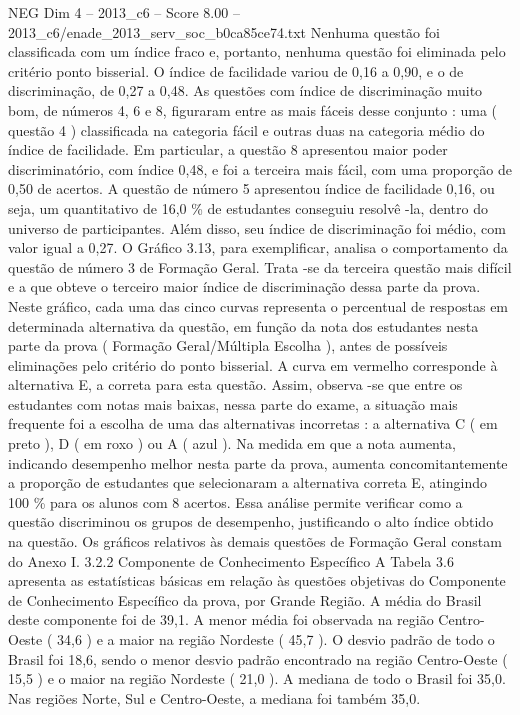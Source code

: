 \begin{textsample}{NEG Dim 4 – 2013\_c6 – Score 8.00 – 2013\_c6/enade\_2013\_serv\_soc\_b0ca85ce74.txt}
Nenhuma questão foi classificada com um índice fraco e, portanto, nenhuma questão foi eliminada pelo critério ponto bisserial.
O índice de facilidade variou de 0,16 a 0,90, e o de discriminação, de 0,27 a 0,48.
As questões com índice de discriminação muito bom, de números 4, 6 e 8, figuraram entre as mais fáceis desse conjunto : uma ( questão 4 ) classificada na categoria fácil e outras duas na categoria médio do índice de facilidade.
Em particular, a questão 8 apresentou maior poder discriminatório, com índice 0,48, e foi a terceira mais fácil, com uma proporção de 0,50 de acertos.
A questão de número 5 apresentou índice de facilidade 0,16, ou seja, um quantitativo de 16,0 \% de estudantes conseguiu resolvê -la, dentro do universo de participantes.
Além disso, seu índice de discriminação foi médio, com valor igual a 0,27.
O Gráfico 3.13, para exemplificar, analisa o comportamento da questão de número 3 de Formação Geral.
Trata -se da terceira questão mais difícil e a que obteve o terceiro maior índice de discriminação dessa parte da prova.
Neste gráfico, cada uma das cinco curvas representa o percentual de respostas em determinada alternativa da questão, em função da nota dos estudantes nesta parte da prova ( Formação Geral/Múltipla Escolha ), antes de possíveis eliminações pelo critério do ponto bisserial.
A curva em vermelho corresponde à alternativa E, a correta para esta questão.
Assim, observa -se que entre os estudantes com notas mais baixas, nessa parte do exame, a situação mais frequente foi a escolha de uma das alternativas incorretas : a alternativa C ( em preto ), D ( em roxo ) ou A ( azul ).
Na medida em que a nota aumenta, indicando desempenho melhor nesta parte da prova, aumenta concomitantemente a proporção de estudantes que selecionaram a alternativa correta E, atingindo 100 \% para os alunos com 8 acertos.
Essa análise permite verificar como a questão discriminou os grupos de desempenho, justificando o alto índice obtido na questão.
Os gráficos relativos às demais questões de Formação Geral constam do Anexo I. 3.2.2 Componente de Conhecimento Específico A Tabela 3.6 apresenta as estatísticas básicas em relação às questões objetivas do Componente de Conhecimento Específico da prova, por Grande Região.
A média do Brasil deste componente foi de 39,1.
A menor média foi observada na região Centro-Oeste ( 34,6 ) e a maior na região Nordeste ( 45,7 ).
O desvio padrão de todo o Brasil foi 18,6, sendo o menor desvio padrão encontrado na região Centro-Oeste ( 15,5 ) e o maior na região Nordeste ( 21,0 ).
A mediana de todo o Brasil foi 35,0.
Nas regiões Norte, Sul e Centro-Oeste, a mediana foi também 35,0.

\end{textsample}
